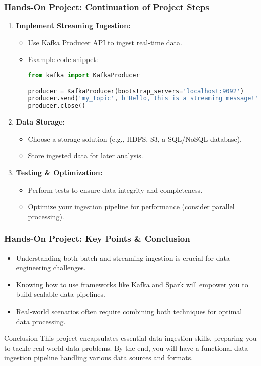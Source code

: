 \documentclass[aspectratio=169]{beamer}
\begin{document}
\begin{frame}[fragile]
    \frametitle{Hands-On Project: Continuation of Project Steps}
    \begin{enumerate}[resume]
        \item \textbf{Implement Streaming Ingestion:}
            \begin{itemize}
                \item Use Kafka Producer API to ingest real-time data.
                \item Example code snippet:
                \begin{lstlisting}[language=Python]
from kafka import KafkaProducer

producer = KafkaProducer(bootstrap_servers='localhost:9092')
producer.send('my_topic', b'Hello, this is a streaming message!')
producer.close()
                \end{lstlisting}
            \end{itemize}
        \item \textbf{Data Storage:}
            \begin{itemize}
                \item Choose a storage solution (e.g., HDFS, S3, a SQL/NoSQL database).
                \item Store ingested data for later analysis.
            \end{itemize}
        \item \textbf{Testing \& Optimization:}
            \begin{itemize}
                \item Perform tests to ensure data integrity and completeness.
                \item Optimize your ingestion pipeline for performance (consider parallel processing).
            \end{itemize}
    \end{enumerate}
\end{frame}

\begin{frame}[fragile]
    \frametitle{Hands-On Project: Key Points & Conclusion}
    \begin{itemize}
        \item Understanding both batch and streaming ingestion is crucial for data engineering challenges.
        \item Knowing how to use frameworks like Kafka and Spark will empower you to build scalable data pipelines.
        \item Real-world scenarios often require combining both techniques for optimal data processing.
    \end{itemize}
    \begin{block}{Conclusion}
        This project encapsulates essential data ingestion skills, preparing you to tackle real-world data problems. By the end, you will have a functional data ingestion pipeline handling various data sources and formats.
    \end{block}
\end{frame}
\end{document}
